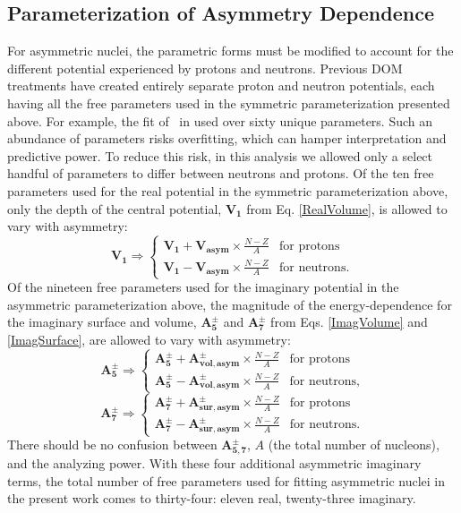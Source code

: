 \subsection{Parameterization of Asymmetry Dependence}
For asymmetric nuclei,
the parametric forms must be modified to account for the different potential experienced by 
protons and neutrons. Previous DOM treatments have created entirely separate
proton and neutron potentials, each having all the free parameters used in the symmetric
parameterization presented above. For example, the fit of \caEight\ in
\cite{MahzoonPhDThesis} used over sixty unique parameters. Such an abundance of
parameters risks overfitting, which can hamper interpretation and predictive power.
To reduce this risk, in this analysis we allowed only a select handful of parameters
to differ between neutrons and protons. Of the ten free parameters used for the real potential
in the symmetric parameterization above,
only the depth of the central potential,
$\bm{V_{1}}$ from Eq. \ref{RealVolume}, is allowed to vary with asymmetry:
\begin{equation}
    \bm{V_{1}} \Rightarrow \begin{cases}
        \bm{V_{1}} + \bm{V_{asym}}\times\frac{N-Z}{A} & \text{for protons}\\
        \bm{V_{1}} - \bm{V_{asym}}\times\frac{N-Z}{A} & \text{for neutrons}.
    \end{cases}
\end{equation}
Of the nineteen free parameters used for the imaginary potential in the asymmetric parameterization
above, the magnitude of the energy-dependence for the imaginary surface and volume,
$\bm{A_{5}^{\pm}}$ and $\bm{A_{7}^{\pm}}$ from Eqs. \ref{ImagVolume} and \ref{ImagSurface},
are allowed to vary with asymmetry:
\begin{equation}
    \bm{A_{5}^{\pm}} \Rightarrow \begin{cases}
        \bm{A_{5}^{\pm}} + \bm{A_{vol, asym}^{\pm}}\times\frac{N-Z}{A} & \text{for protons}\\
        \bm{A_{5}^{\pm}} - \bm{A_{vol, asym}^{\pm}}\times\frac{N-Z}{A} & \text{for neutrons},
    \end{cases}
\end{equation}
\begin{equation}
    \bm{A_{7}^{\pm}} \Rightarrow \begin{cases}
        \bm{A_{7}^{\pm}} + \bm{A_{sur, asym}^{\pm}}\times\frac{N-Z}{A} & \text{for protons}\\
        \bm{A_{7}^{\pm}} - \bm{A_{sur, asym}^{\pm}}\times\frac{N-Z}{A} & \text{for neutrons}.
    \end{cases}
\end{equation}
There should be no confusion between $\bm{A_{5,7}^{\pm}}$, $A$ (the total number
of nucleons), and the analyzing power. 
With these four additional asymmetric imaginary terms, the total number of
free parameters used for
fitting asymmetric nuclei in the present work comes to thirty-four: eleven real, twenty-three imaginary.

